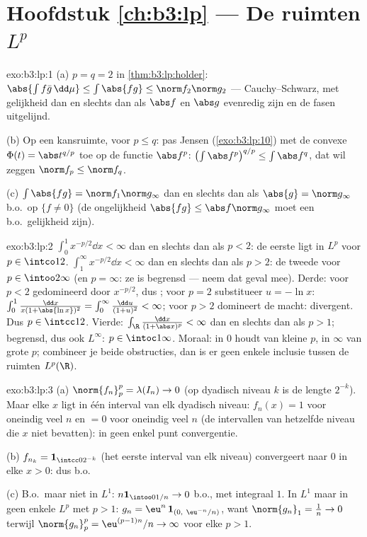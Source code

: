 \section*{Hoofdstuk \ref{ch:b3:lp} --- De ruimten $L^p$}

\begin{solution}{exo:b3:lp:1}
(a) $p = q = 2$ in \cref{thm:b3:lp:holder}: $\abs{\int f\bar
g\,\dd\mu} \leq \int\abs{fg} \leq \norm f_2\norm g_2$ ---
Cauchy--Schwarz, met gelijkheid dan en slechts dan als $\abs f$
en $\abs g$ evenredig zijn en de fasen uitgelijnd.

(b) Op een kansruimte, voor $p \leq q$: pas Jensen
(\cref{exo:b3:lp:10}) met de convexe $\Phi(t) = \abs t^{q/p}$ toe
op de functie $\abs f^p$: $\bigl(\int\abs f^p\bigr)^{q/p} \leq
\int\abs f^q$, dat wil zeggen $\norm f_p \leq \norm f_q$.

(c) $\int\abs{fg} = \norm f_1\norm g_\infty$ dan en slechts dan
als $\abs{g} = \norm g_\infty$ b.o.\ op $\{f \neq 0\}$ (de
ongelijkheid $\abs{fg} \leq \abs f\norm g_\infty$ moet een
b.o.\ gelijkheid zijn).
\end{solution}

\begin{solution}{exo:b3:lp:2}
$\int_0^1 x^{-p/2}\dd x < \infty$ dan en slechts dan als $p < 2$:
de eerste ligt in $L^p$ voor $p \in \intco12$. $\int_1^\infty
x^{-p/2}\dd x < \infty$ dan en slechts dan als $p > 2$: de tweede
voor $p \in \intoo2\infty$ (en $p = \infty$: ze is begrensd ---
neem dat geval mee). Derde: voor $p < 2$ gedomineerd door
$x^{-p/2}$, dus ; voor $p = 2$ substitueer $u = -\ln
x$: $\int_0^1\frac{\dd x}{x(1 + \abs{\ln x})^2} =
\int_0^\infty\frac{\dd u}{(1 + u)^2} < \infty$; voor $p > 2$
domineert de macht: divergent. Dus $p \in \intcc12$. Vierde:
$\int_\R\frac{\dd x}{(1 + \abs x)^p} < \infty$ dan en slechts dan
als $p > 1$; begrensd, dus ook $L^\infty$: $p \in \intoc1\infty$.
Moraal:  in $0$ houdt van kleine $p$, in
$\infty$ van grote $p$; combineer je beide obstructies, dan is er
geen enkele inclusie tussen de ruimten $L^p(\R)$.
\end{solution}

\begin{solution}{exo:b3:lp:3}
(a) $\norm{f_n}_p^p = \lambda(I_n) \to 0$ (op dyadisch niveau $k$
is de lengte $2^{-k}$). Maar elke $x$ ligt in één interval van
elk dyadisch niveau: $f_n(x) = 1$ voor oneindig veel $n$ en $= 0$
voor oneindig veel $n$ (de intervallen van hetzelfde niveau die
$x$ niet bevatten): in geen enkel punt convergentie.

(b) $f_{n_k} = \mathbf 1_{\intcc0{2^{-k}}}$ (het eerste interval
van elk niveau) convergeert naar $0$ in elke $x > 0$: dus b.o.

(c) B.o.\ maar niet in $L^1$: $n\mathbf 1_{\intoo0{1/n}} \to 0$
b.o., met integraal $1$. In $L^1$ maar in geen enkele $L^p$ met
$p > 1$: $g_n = \eu^n\,\mathbf 1_{(0,\ \eu^{-n}/n)}$, want
$\norm{g_n}_1 = \frac1n \to 0$ terwijl $\norm{g_n}_p^p =
\eu^{(p-1)n}/n \to \infty$ voor elke $p > 1$.
\end{solution}

